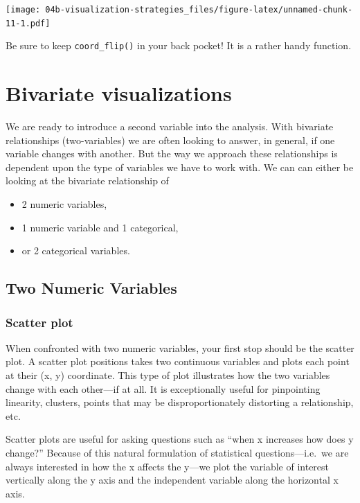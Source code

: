 \documentclass[
]{book}
\providecommand{\tightlist}{%
  \setlength{\itemsep}{0pt}\setlength{\parskip}{0pt}}
\begin{document}
\texttt{[image: 04b-visualization-strategies\_files/figure-latex/unnamed-chunk-11-1.pdf]}

Be sure to keep \texttt{coord\_flip()} in your back pocket! It is a rather handy function.

\hypertarget{bivariate-visualizations}{%
\section{Bivariate visualizations}\label{bivariate-visualizations}}

We are ready to introduce a second variable into the analysis. With bivariate relationships (two-variables) we are often looking to answer, in general, if one variable changes with another. But the way we approach these relationships is dependent upon the type of variables we have to work with. We can can either be looking at the bivariate relationship of

\begin{itemize}
\tightlist
\item
  2 numeric variables,
\item
  1 numeric variable and 1 categorical,
\item
  or 2 categorical variables.
\end{itemize}

\hypertarget{two-numeric-variables}{%
\subsection{Two Numeric Variables}\label{two-numeric-variables}}

\hypertarget{scatter-plot}{%
\subsubsection{Scatter plot}\label{scatter-plot}}

When confronted with two numeric variables, your first stop should be the scatter plot. A scatter plot positions takes two continuous variables and plots each point at their (x, y) coordinate. This type of plot illustrates how the two variables change with each other---if at all. It is exceptionally useful for pinpointing linearity, clusters, points that may be disproportionately distorting a relationship, etc.

Scatter plots are useful for asking questions such as ``when x increases how does y change?'' Because of this natural formulation of statistical questions---i.e.~we are always interested in how the x affects the y---we plot the variable of interest vertically along the y axis and the independent variable along the horizontal x axis.
\end{document}

